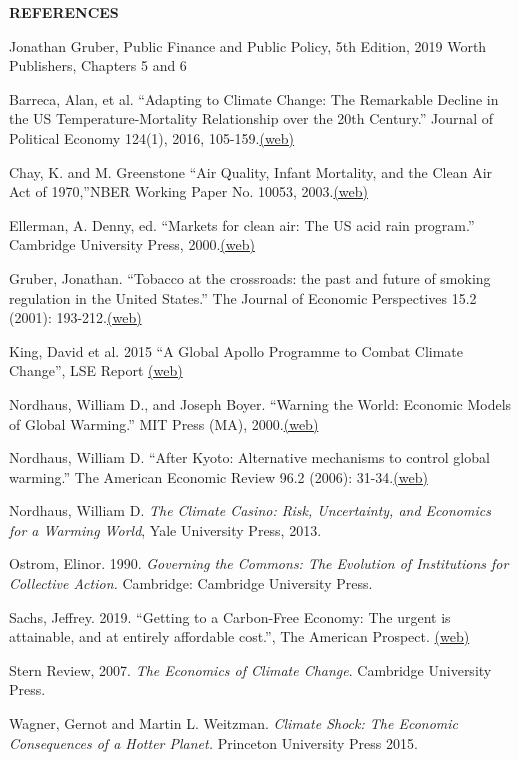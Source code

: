 \documentclass[landscape]{slides}
\begin{document}
\begin{slide}
\begin{center}
{\bf REFERENCES}
\end{center}
{\small

Jonathan Gruber, Public Finance and Public Policy, 5th Edition, 2019 Worth Publishers, Chapters 5 and 6

Barreca, Alan, et al. ``Adapting to Climate Change: The Remarkable Decline in the US Temperature-Mortality Relationship over the 20th Century.'' Journal of Political Economy 124(1), 2016, 105-159.\href{http://elsa.berkeley.edu/~saez/course131/barrecaetalJPE16.pdf}{(web)}

Chay, K. and M. Greenstone ``Air Quality, Infant Mortality, and the Clean Air Act of 1970,''NBER Working 
Paper No. 10053, 2003.\href{http://www.nber.org/papers/w10053.pdf}{(web)}

Ellerman, A. Denny, ed. ``Markets for clean air: The US acid rain program.'' Cambridge University Press, 2000.\href{http://elsa.berkeley.edu/~saez/course131/Clean-Air00.pdf}{(web)}

Gruber, Jonathan. ``Tobacco at the crossroads: the past and future of smoking regulation in the United States.'' The Journal of Economic Perspectives 15.2 (2001): 193-212.\href{http://www.jstor.org/stable/pdfplus/2696598.pdf?&acceptTC=true&jpdConfirm=true}{(web)}

King, David et al. 2015 ``A Global Apollo Programme to Combat Climate Change'', LSE Report
\href{http://elsa.berkeley.edu/~saez/course131/apollo.pdf}{(web)}

Nordhaus, William D., and Joseph Boyer. ``Warning the World: Economic Models of Global Warming.'' MIT Press (MA), 2000.\href{http://elsa.berkeley.edu/~saez/course131/Warm-World00.pdf}{(web)}

Nordhaus, William D. ``After Kyoto: Alternative mechanisms to control global warming.'' The American Economic Review 96.2 (2006): 31-34.\href{http://www.jstor.org/stable/pdfplus/30034609.pdf?&acceptTC=true&jpdConfirm=true}{(web)}

Nordhaus, William D.  \emph{The Climate Casino: Risk, Uncertainty, and Economics for a Warming World},
Yale University Press, 2013.

Ostrom, Elinor. 1990. \emph{Governing the Commons: The Evolution of Institutions for Collective Action.} Cambridge: Cambridge University Press.

Sachs, Jeffrey. 2019. ``Getting to a Carbon-Free Economy: The urgent is attainable, and at entirely affordable cost.'', The American Prospect.
\href{https://prospect.org/greennewdeal/getting-to-a-carbon-free-economy/}{(web)}

Stern Review, 2007. \emph{The Economics of Climate Change}. Cambridge University Press.

Wagner, Gernot  and Martin L. Weitzman. \emph{Climate Shock: The Economic Consequences of a Hotter Planet.}
Princeton University Press 2015.
}

\end{slide}
\end{document}
